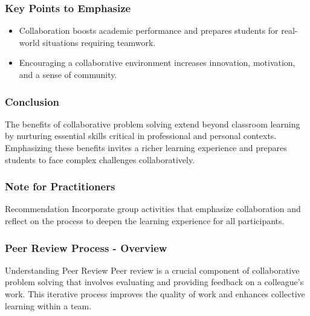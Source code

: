 \documentclass{beamer}
\begin{document}
\begin{frame}[fragile]
    \frametitle{Key Points to Emphasize}
    \begin{itemize}
        \item Collaboration boosts academic performance and prepares students for real-world situations requiring teamwork.
        \item Encouraging a collaborative environment increases innovation, motivation, and a sense of community.
    \end{itemize}
\end{frame}

\begin{frame}[fragile]
    \frametitle{Conclusion}
    The benefits of collaborative problem solving extend beyond classroom learning by nurturing essential skills critical in professional and personal contexts. Emphasizing these benefits invites a richer learning experience and prepares students to face complex challenges collaboratively.
\end{frame}

\begin{frame}[fragile]
    \frametitle{Note for Practitioners}
    \begin{block}{Recommendation}
        Incorporate group activities that emphasize collaboration and reflect on the process to deepen the learning experience for all participants.
    \end{block}
\end{frame}

\begin{frame}[fragile]
    \frametitle{Peer Review Process - Overview}
    \begin{block}{Understanding Peer Review}
        Peer review is a crucial component of collaborative problem solving that involves evaluating and providing feedback on a colleague’s work. This iterative process improves the quality of work and enhances collective learning within a team.
    \end{block}
\end{frame}
\end{document}
